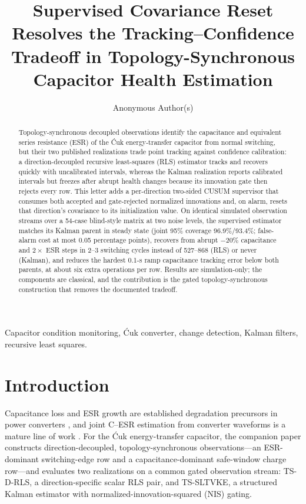 \documentclass[journal]{IEEEtran}
\title{Supervised Covariance Reset Resolves the Tracking--Confidence
Tradeoff in Topology-Synchronous Capacitor Health Estimation}
\author{Anonymous Author(s)}
\newcommand{\Cuk}{\'{C}uk}
\newcommand{\TSRLS}{TS-D-RLS}
\newcommand{\TSKF}{TS-SLTVKE}
\begin{document}
\maketitle

\begin{abstract}
Topology-synchronous decoupled observations identify the capacitance and
equivalent series resistance (ESR) of the \Cuk{} energy-transfer capacitor
from normal switching, but their two published realizations trade point
tracking against confidence calibration: a direction-decoupled recursive
least-squares (RLS) estimator tracks and recovers quickly with
uncalibrated intervals, whereas the Kalman realization reports calibrated
intervals but freezes after abrupt health changes because its innovation
gate then rejects every row. This letter adds a per-direction two-sided
CUSUM supervisor that consumes both accepted and gate-rejected normalized
innovations and, on alarm, resets that direction's covariance to its
initialization value. On identical simulated observation streams over a
54-case blind-style matrix at two noise levels, the supervised estimator
matches its Kalman parent in steady state (joint 95\% coverage
96.9\%/93.4\%; false-alarm cost at most 0.05 percentage points), recovers
from abrupt $-20\%$ capacitance and $2\times$ ESR steps in 2--3 switching
cycles instead of 527--868 (RLS) or never (Kalman), and reduces the
hardest 0.1-s ramp capacitance tracking error below both parents, at
about six extra operations per row. Results are simulation-only; the
components are classical, and the contribution is the gated
topology-synchronous construction that removes the documented tradeoff.
\end{abstract}

\begin{IEEEkeywords}
Capacitor condition monitoring, \Cuk{} converter, change detection,
Kalman filters, recursive least squares.
\end{IEEEkeywords}

\section{Introduction}
Capacitance loss and ESR growth are established degradation precursors in
power converters \cite{wang2014reliability,zhao2021overview}, and joint
C--ESR estimation from converter waveforms is a mature line of work
\cite{yao2015buck,hasegawa2018dclink}. For the \Cuk{} energy-transfer
capacitor, the companion paper \cite{companion2026} constructs
direction-decoupled, topology-synchronous observations---an ESR-dominant
switching-edge row and a capacitance-dominant safe-window charge row---and
evaluates two realizations on a common gated observation stream: \TSRLS{},
a direction-specific scalar RLS pair, and \TSKF{}, a structured Kalman
estimator with normalized-innovation-squared (NIS) gating.
\end{document}
